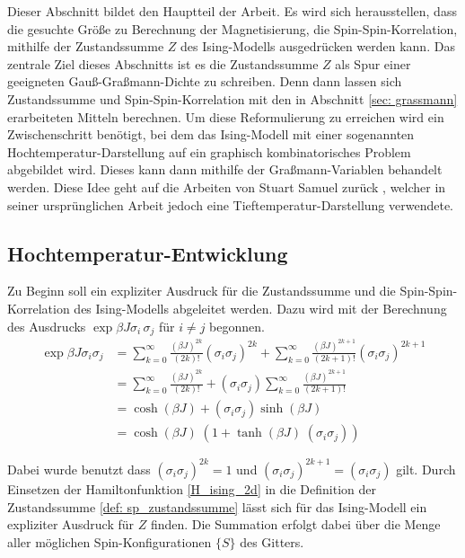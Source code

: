 Dieser Abschnitt bildet den Hauptteil der Arbeit. Es wird sich herausstellen, dass die gesuchte Größe zu Berechnung der Magnetisierung, die Spin-Spin-Korrelation, mithilfe der Zustandssumme $Z$ des Ising-Modells ausgedrücken werden kann. Das zentrale Ziel dieses Abschnitts ist es die Zustandssumme $Z$ als Spur einer geeigneten Gauß-Graßmann-Dichte zu schreiben. Denn dann lassen sich Zustandssumme und Spin-Spin-Korrelation  mit den in Abschnitt \ref{sec: grassmann} erarbeiteten Mitteln berechnen. Um diese Reformulierung zu erreichen wird ein Zwischenschritt benötigt, bei dem das Ising-Modell mit einer sogenannten Hochtemperatur-Darstellung auf ein graphisch kombinatorisches Problem abgebildet wird. Dieses kann dann mithilfe der Graßmann-Variablen behandelt werden. Diese Idee geht auf die Arbeiten von Stuart Samuel zurück \cite{StuartSamuel1} \cite{StuartSamuel2}, welcher in seiner ursprünglichen Arbeit jedoch eine Tieftemperatur-Darstellung verwendete. 

\subsection{Hochtemperatur-Entwicklung} 

 \noindent Zu Beginn soll ein expliziter Ausdruck für die Zustandssumme und die Spin-Spin-Korrelation des Ising-Modells abgeleitet werden. Dazu wird mit der Berechnung des Ausdrucks $\exp{\beta J \sigma_i \, \sigma_j} $ für $i \neq j$ begonnen.
\begin{align}
\exp{\beta J \sigma_i \sigma_j} & = \sum_{k=0}^{\infty} \frac{(\beta J)^{2k}}{(2k)!}(\sigma_i \sigma_j)^{2k} + \sum_{k=0}^{\infty} \frac{(\beta J)^{2k+1}}{(2k+1)!}(\sigma_i \sigma_j)^{2k+1} \nonumber  \\
& = \sum_{k=0}^{\infty} \frac{(\beta J)^{2k}}{(2k)!} + (\sigma_i \sigma_j) \sum_{k=0}^{\infty} \frac{(\beta J)^{2k+1}}{(2k+1)!} \nonumber  \\
& = \cosh(\beta J) + (\sigma_i \sigma_j) \sinh(\beta J) \nonumber  \\
& = \cosh(\beta J) \; (1 +  \tanh(\beta J) \; (\sigma_i \sigma_j)) \label{eq: exp(beta J sig sig)}
\end{align}

\noindent Dabei wurde benutzt dass $(\sigma_i \sigma_j)^{2k} = 1$ und $(\sigma_i \sigma_j)^{2k+1} = (\sigma_i \sigma_j)$ gilt. Durch Einsetzen der Hamiltonfunktion \eqref{H_ising_2d} in die Definition der Zustandssumme \eqref{def: sp_zustandssumme} lässt sich für das Ising-Modell ein expliziter Ausdruck für $Z$ finden. Die Summation erfolgt dabei über die Menge aller möglichen Spin-Konfigurationen $\{S\}$ des Gitters.

